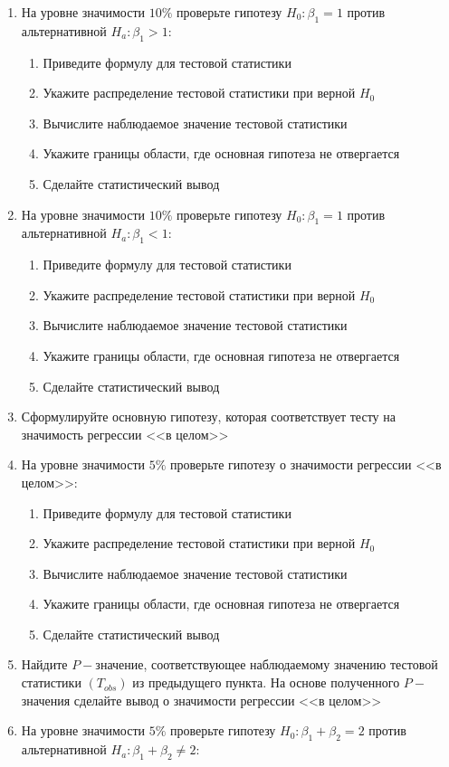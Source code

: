 \documentclass[pdftex,11pt,openany]{book}\usepackage[]{graphicx}\usepackage[]{color}
\begin{document}
\begin{problem}
\begin{enumerate}
\item На уровне значимости $10\%$ проверьте гипотезу $H_0: \beta_1 = 1$ против альтернативной $H_a: \beta_1 > 1$:
\begin{enumerate}
\item Приведите формулу для тестовой статистики 
\item Укажите распределение тестовой статистики при верной $H_0$
\item Вычислите наблюдаемое значение тестовой статистики
\item Укажите границы области, где основная гипотеза не отвергается
\item Сделайте статистический вывод
\end{enumerate}
\item На уровне значимости $10\%$ проверьте гипотезу $H_0: \beta_1 = 1$ против альтернативной $H_a: \beta_1 < 1$:
\begin{enumerate}
\item Приведите формулу для тестовой статистики 
\item Укажите распределение тестовой статистики при верной $H_0$
\item Вычислите наблюдаемое значение тестовой статистики
\item Укажите границы области, где основная гипотеза не отвергается
\item Сделайте статистический вывод
\end{enumerate}
\item Сформулируйте основную гипотезу, которая соответствует тесту на значимость регрессии <<в целом>>
\item На уровне значимости $5\%$ проверьте гипотезу о значимости регрессии <<в целом>>:
\begin{enumerate}
\item Приведите формулу для тестовой статистики 
\item Укажите распределение тестовой статистики при верной $H_0$
\item Вычислите наблюдаемое значение тестовой статистики
\item Укажите границы области, где основная гипотеза не отвергается
\item Сделайте статистический вывод
\end{enumerate}
\item Найдите $P-$значение, соответствующее наблюдаемому значению тестовой статистики $(T_{obs})$ из предыдущего пункта. На основе полученного $P-$значения сделайте вывод о значимости регрессии <<в целом>>
\item На уровне значимости $5\%$ проверьте гипотезу  $H_0: \beta_1 + \beta_2 = 2$ против альтернативной $H_a: \beta_1 + \beta_2 \not= 2$:

\end{enumerate}
\end{problem}
\end{document}
